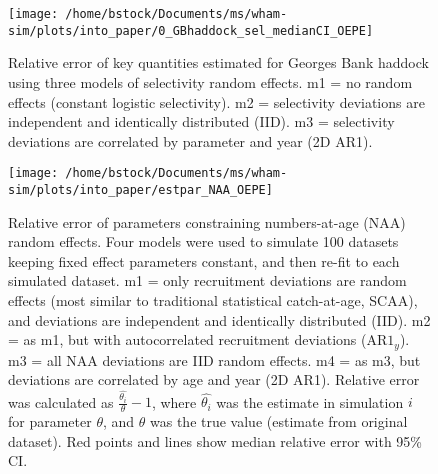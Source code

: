 \documentclass[]{article}
\begin{document}
\pagebreak

\begin{figure}

{\centering \texttt{[image: /home/bstock/Documents/ms/wham-sim/plots/into\_paper/0\_GBhaddock\_sel\_medianCI\_OEPE]} 

}

\caption{Relative error of key quantities estimated for Georges Bank haddock using three models of selectivity random effects. m1 = no random effects (constant logistic selectivity). m2 = selectivity deviations are independent and identically distributed (IID). m3 = selectivity deviations are correlated by parameter and year (2D AR1).}\label{fig:rel-error-GBhaddock-sel}
\end{figure}

\pagebreak

\begin{figure}

{\centering \texttt{[image: /home/bstock/Documents/ms/wham-sim/plots/into\_paper/estpar\_NAA\_OEPE]} 

}

\caption{Relative error of parameters constraining numbers-at-age (NAA) random effects. Four models were used to simulate 100 datasets keeping fixed effect parameters constant, and then re-fit to each simulated dataset. m1 = only recruitment deviations are random effects (most similar to traditional statistical catch-at-age, SCAA), and deviations are independent and identically distributed (IID). m2 = as m1, but with autocorrelated recruitment deviations ($\text{AR1}_y$). m3 = all NAA deviations are IID random effects. m4 = as m3, but deviations are correlated by age and year (2D AR1). Relative error was calculated as $\frac{\hat{\theta_i}}{\theta} - 1$, where $\hat{\theta_i}$ was the estimate in simulation $i$ for parameter $\theta$, and $\theta$ was the true value (estimate from original dataset). Red points and lines show median relative error with 95\% CI.}\label{fig:estpar-naa}
\end{figure}

\pagebreak
\end{document}
